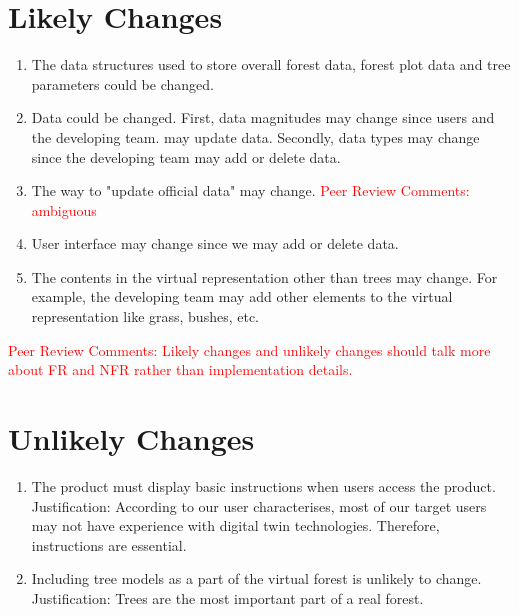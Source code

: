 \documentclass{article}
\begin{document}
\newpage

\section{Likely Changes}
\begin{enumerate}
    \item The data structures used to store overall forest data,
    forest plot data and tree parameters could be changed.
    \item Data could be changed. First, data magnitudes may change since users and the developing team.
    may update data. Secondly, data types may change since the developing team may add or 
    delete data.
    \item The way to "update official data" may change. \textcolor{red}{Peer Review Comments: 
    ambiguous}
    \item User interface may change since we may add or delete data.
    \item The contents in the virtual representation other than trees may change. For example,
    the developing team may add other elements to the virtual representation like grass, bushes, etc.
\end{enumerate}

\noindent \textcolor{red}{Peer Review Comments: Likely changes and unlikely changes should talk more
 about FR and NFR rather than implementation details.}

\section{Unlikely Changes}
\begin{enumerate}
    \item The product must display basic instructions when users access the product.\\
    Justification: According to our user characterises, most of our target users may not have 
    experience with digital twin technologies. Therefore, instructions are essential.
    \item Including tree models 
    as a part of the virtual forest is unlikely to change.\\ Justification: Trees are the most important
    part of a real forest.
\end{enumerate}
\end{document}
